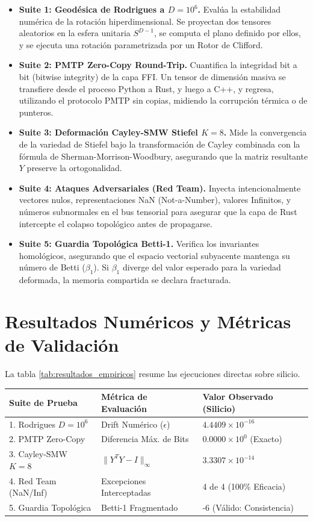 \begin{itemize}
    \item \textbf{Suite 1: Geodésica de Rodrigues a $D=10^6$.} Evalúa la estabilidad numérica de la rotación hiperdimensional. Se proyectan dos tensores aleatorios en la esfera unitaria $S^{D-1}$, se computa el plano definido por ellos, y se ejecuta una rotación parametrizada por un Rotor de Clifford.
    \item \textbf{Suite 2: PMTP Zero-Copy Round-Trip.} Cuantifica la integridad bit a bit (bitwise integrity) de la capa FFI. Un tensor de dimensión masiva se transfiere desde el proceso Python a Rust, y luego a C++, y regresa, utilizando el protocolo PMTP sin copias, midiendo la corrupción térmica o de punteros.
    \item \textbf{Suite 3: Deformación Cayley-SMW Stiefel $K=8$.} Mide la convergencia de la variedad de Stiefel bajo la transformación de Cayley combinada con la fórmula de Sherman-Morrison-Woodbury, asegurando que la matriz resultante $Y$ preserve la ortogonalidad.
    \item \textbf{Suite 4: Ataques Adversariales (Red Team).} Inyecta intencionalmente vectores nulos, representaciones NaN (Not-a-Number), valores Infinitos, y números subnormales en el bus tensorial para asegurar que la capa de Rust intercepte el colapso topológico antes de propagarse.
    \item \textbf{Suite 5: Guardia Topológica Betti-1.} Verifica los invariantes homológicos, asegurando que el espacio vectorial subyacente mantenga su número de Betti ($\beta_1$). Si $\beta_1$ diverge del valor esperado para la variedad deformada, la memoria compartida se declara fracturada.
\end{itemize}

\section{Resultados Numéricos y Métricas de Validación}
La tabla \ref{tab:resultados_empiricos} resume las ejecuciones directas sobre silicio. 


\centering
\begin{tabular}{|l|l|l|}
\hline
\textbf{Suite de Prueba} & \textbf{Métrica de Evaluación} & \textbf{Valor Observado (Silicio)} \\ \hline
1. Rodrigues $D=10^6$ & Drift Numérico ($\epsilon$) & $4.4409 \times 10^{-16}$ \\ \hline
2. PMTP Zero-Copy & Diferencia Máx. de Bits & $0.0000 \times 10^0$ (Exacto) \\ \hline
3. Cayley-SMW $K=8$ & $\|Y^T Y - I\|_{\infty}$ & $3.3307 \times 10^{-14}$ \\ \hline
4. Red Team (NaN/Inf) & Excepciones Interceptadas & 4 de 4 (100\% Eficacia) \\ \hline
5. Guardia Topológica & Betti-1 Fragmentado & -6 (Válido: Consistencia) \\ \hline
\end{tabular}




